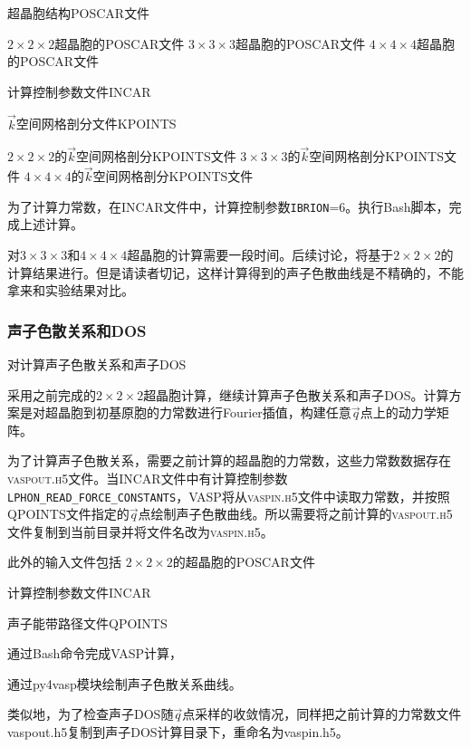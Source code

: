 超晶胞结构\textrm{POSCAR}文件

$2\times2\times2$超晶胞的\textrm{POSCAR}文件
$3\times3\times3$超晶胞的\textrm{POSCAR}文件
$4\times4\times4$超晶胞的\textrm{POSCAR}文件

计算控制参数文件\textrm{INCAR}

$\vec k$空间网格剖分文件\textrm{KPOINTS}

$2\times2\times2$的$\vec k$空间网格剖分\textrm{KPOINTS}文件
$3\times3\times3$的$\vec k$空间网格剖分\textrm{KPOINTS}文件
$4\times4\times4$的$\vec k$空间网格剖分\textrm{KPOINTS}文件

为了计算力常数，在\textrm{INCAR}文件中，计算控制参数\texttt{IBRION}=6。执行\textrm{Bash}脚本，完成上述计算。

对$3\times3\times3$和$4\times4\times4$超晶胞的计算需要一段时间。后续讨论，将基于$2\times2\times2$的计算结果进行。但是请读者切记，这样计算得到的声子色散曲线是不精确的，不能拿来和实验结果对比。%

\subsubsection{声子色散关系和\rm{DOS}}
对计算声子色散关系和声子\textrm{DOS}

采用之前完成的$2\times2\times2$超晶胞计算，继续计算声子色散关系和声子\textrm{DOS}。计算方案是对超晶胞到初基原胞的力常数进行\textrm{Fourier}插值，构建任意$\vec q$点上的动力学矩阵。

为了计算声子色散关系，需要之前计算的超晶胞的力常数，这些力常数数据存在\textsc{vaspout.h5}文件。当\textrm{INCAR}文件中有计算控制参数\texttt{LPHON\_READ\_FORCE\_CONSTANTS}，\textrm{VASP}将从\textsc{vaspin.h5}文件中读取力常数，并按照\textrm{QPOINTS}文件指定的$\vec q$点绘制声子色散曲线。所以需要将之前计算的\textsc{vaspout.h5}文件复制到当前目录并将文件名改为\textsc{vaspin.h5}。

此外的输入文件包括
$2\times2\times2$的超晶胞的\textrm{POSCAR}文件

计算控制参数文件\textrm{INCAR}

声子能带路径文件\textrm{QPOINTS}

通过\textrm{Bash}命令完成\textrm{VASP}计算，

通过\textrm{py4vasp}模块绘制声子色散关系曲线。

类似地，为了检查声子\textrm{DOS}随$\vec q$点采样的收敛情况，同样把之前计算的力常数文件\textrm{vaspout.h5}复制到声子\textrm{DOS}计算目录下，重命名为\textrm{vaspin.h5}。

